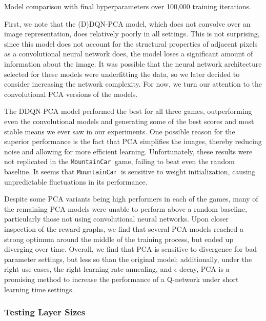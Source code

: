 \documentclass[11pt]{article}
\newcommand{\mc}{\texttt{MountainCar}}
\begin{document}
\begin{table}[!ht]
    \footnotesize
    \centering
    
    
    \caption{Model comparison with final hyperparameters over 100,000 training iterations.}
    \label{tab:final_v1_100k}
\end{table}

First, we note that the (D)DQN-PCA model, which does not convolve over an image representation, does relatively poorly in all settings. This is not surprising, since this model does not account for the structural properties of adjacent pixels as a convolutional neural network does, the model loses a significant amount of information about the image. It was possible that the neural network architecture selected for these models were underfitting the data, so we later decided to consider increasing the network complexity. For now, we turn our attention to the convolutional PCA versions of the models.

The DDQN-PCA model performed the best for all three games, outperforming even the convolutional models and generating some of the best scores and most stable means we ever saw in our experiments. One possible reason for the superior performance is the fact that PCA simplifies the images, thereby reducing noise and allowing for more efficient learning. Unfortunately, these results were not replicated in the \mc~game, failing to beat even the random baseline. It seems that \mc~is sensitive to weight initialization, causing unpredictable fluctuations in its performance.

Despite some PCA variants being high performers in each of the games, many of the remaining PCA models were unable to perform above a random baseline, particularly those not using convolutional neural networks. Upon closer inspection of the reward graphs, we find that several PCA models reached a strong optimum around the middle of the training process, but ended up diverging over time. Overall, we find that PCA is sensitive to divergence for bad parameter settings, but less so than the original model; additionally, under the right use cases, the right learning rate annealing, and $\epsilon$ decay, PCA is a promising method to increase the performance of a Q-network under short learning time settings.

\subsubsection{Testing Layer Sizes}
\end{document}
